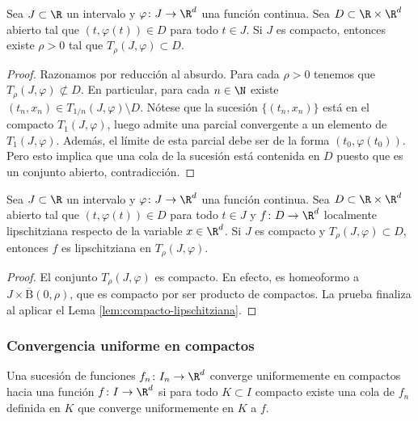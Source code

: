 \begin{lemma}
  Sea $J \subset \R$ un intervalo y $\varphi \colon J \to \R^d$ una función continua. Sea
  $D \subset \R \times \R^d$ abierto tal que $(t, \varphi(t)) \in D$ para todo $t \in J$. Si $J$ es
  compacto, entonces existe $\rho > 0$ tal que $T_{\rho}(J,\varphi) \subset D$.
\end{lemma}
\begin{proof}
  Razonamos por reducción al absurdo. Para cada $\rho > 0$ tenemos que
  $T_{\rho}(J, \varphi) \not \subset D$. En particular, para cada $n \in \N$ existe
  $(t_n, x_n) \in T_{1/n}(J,\varphi) \setminus D$. Nótese que la sucesión $\{(t_n,x_n)\}$ está en el
  compacto $T_1(J,\varphi)$, luego admite una parcial convergente a un elemento de
  $T_1(J,\varphi)$. Además, el límite de esta parcial debe ser de la forma $(t_0,
  \varphi(t_0))$. Pero esto implica que una cola de la sucesión está contenida en $D$ puesto que es
  un conjunto abierto, contradicción.
\end{proof}

\begin{proposition}
  Sea $J \subset \R$ un intervalo y $\varphi \colon J \to \R^d$ una función continua. Sea
  $D \subset \R \times \R^d$ abierto tal que $(t, \varphi(t)) \in D$ para todo $t \in J$ y
  $f \colon D \to \R^d$ localmente lipschitziana respecto de la variable $x \in \R^d$. Si $J$ es
  compacto y $T_{\rho}(J,\varphi) \subset D$, entonces $f$ es lipschitziana en
  $T_{\rho}(J,\varphi)$.
\end{proposition}
\begin{proof}
  El conjunto $T_{\rho}(J,\varphi)$ es compacto. En efecto, es homeoformo a
  $J \times \overline{\mathrm{B}}(0,\rho)$, que es compacto por ser producto de compactos. La prueba
  finaliza al aplicar el Lema \ref{lem:compacto-lipschitziana}.
\end{proof}


\subsubsection{Convergencia uniforme en compactos}

\begin{definition}
  Una sucesión de funciones $f_n \colon I_{n} \to \R^d$ converge uniformemente en compactos hacia
  una función $f \colon I \to \R^d$ si para todo $K \subset I$ compacto existe una cola de $f_n$
  definida en $K$ que converge uniformemente en $K$ a $f$.
\end{definition}

